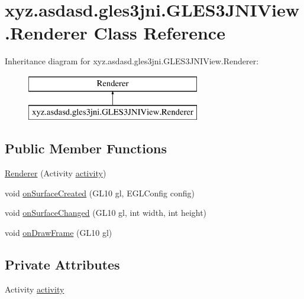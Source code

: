 \hypertarget{classxyz_1_1asdasd_1_1gles3jni_1_1_g_l_e_s3_j_n_i_view_1_1_renderer}{}\section{xyz.\+asdasd.\+gles3jni.\+G\+L\+E\+S3\+J\+N\+I\+View.\+Renderer Class Reference}
\label{classxyz_1_1asdasd_1_1gles3jni_1_1_g_l_e_s3_j_n_i_view_1_1_renderer}
Inheritance diagram for xyz.\+asdasd.\+gles3jni.\+G\+L\+E\+S3\+J\+N\+I\+View.\+Renderer\+:\begin{figure}[H]
\begin{center}
\leavevmode
\includegraphics[height=2.000000cm]{d4/d13/classxyz_1_1asdasd_1_1gles3jni_1_1_g_l_e_s3_j_n_i_view_1_1_renderer}
\end{center}
\end{figure}
\subsection*{Public Member Functions}
\begin{DoxyCompactItemize}
\item 
\hyperlink{classxyz_1_1asdasd_1_1gles3jni_1_1_g_l_e_s3_j_n_i_view_1_1_renderer_a88700886ccb03b7f945230035da91492}{Renderer} (Activity \hyperlink{classxyz_1_1asdasd_1_1gles3jni_1_1_g_l_e_s3_j_n_i_view_1_1_renderer_a8b248082d36e81244b05658495ba1fec}{activity})
\item 
void \hyperlink{classxyz_1_1asdasd_1_1gles3jni_1_1_g_l_e_s3_j_n_i_view_1_1_renderer_aca6d67247aecd388480000030d8ca804}{on\+Surface\+Created} (G\+L10 gl, E\+G\+L\+Config config)
\item 
void \hyperlink{classxyz_1_1asdasd_1_1gles3jni_1_1_g_l_e_s3_j_n_i_view_1_1_renderer_a641118b0930da49417e4791dc7d08453}{on\+Surface\+Changed} (G\+L10 gl, int width, int height)
\item 
void \hyperlink{classxyz_1_1asdasd_1_1gles3jni_1_1_g_l_e_s3_j_n_i_view_1_1_renderer_acb6410e1c7136fb4619f833a8a6f222b}{on\+Draw\+Frame} (G\+L10 gl)
\end{DoxyCompactItemize}
\subsection*{Private Attributes}
\begin{DoxyCompactItemize}
\item 
Activity \hyperlink{classxyz_1_1asdasd_1_1gles3jni_1_1_g_l_e_s3_j_n_i_view_1_1_renderer_a8b248082d36e81244b05658495ba1fec}{activity}
\end{DoxyCompactItemize}


